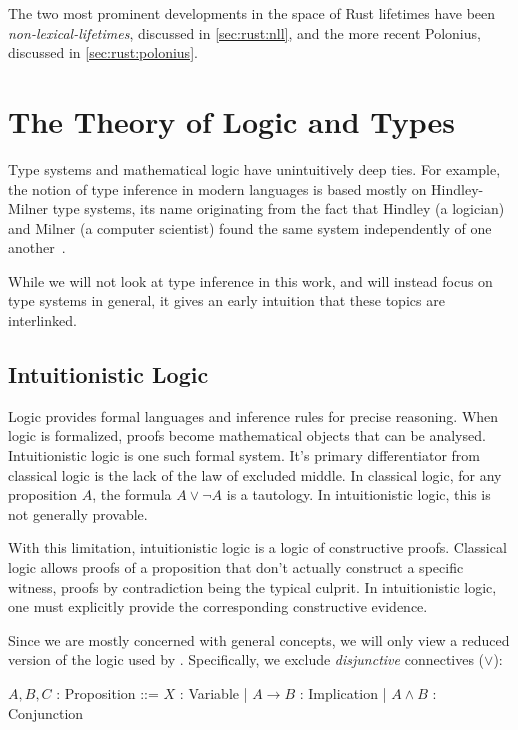 \documentclass[sigplan,11pt,screen,nonacm]{acmart}
\begin{document}
The two most prominent developments in the space of Rust lifetimes have been \emph{non-lexical-lifetimes}, discussed in \cref{sec:rust:nll}, and the more recent Polonius, discussed in \cref{sec:rust:polonius}.

\section{The Theory of Logic and Types} \label{sec:theory}

Type systems and mathematical logic have unintuitively deep ties. For example, the notion of type inference in modern languages is based mostly on Hindley-Milner type systems, its name originating from the fact that Hindley (a logician) and Milner (a computer scientist) found the same system independently of one another~\cite{hindley, milner}.

While we will not look at type inference in this work, and will instead focus on type systems in general, it gives an early intuition that these topics are interlinked.

\subsection{Intuitionistic Logic} \label{sec:intuitionistic:logic}

Logic provides formal languages and inference rules for precise reasoning. When logic is formalized, proofs become mathematical objects that can be analysed. Intuitionistic logic is one such formal system. It's primary differentiator from classical logic is the lack of the law of excluded middle. In classical logic, for any proposition \(A\), the formula \(A \lor \lnot A\) is a tautology. In intuitionistic logic, this is not generally provable.~\cite{mints-intro-intuitionistic-logic}

With this limitation, intuitionistic logic is a logic of constructive proofs. Classical logic allows proofs of a proposition that don't actually construct a specific witness, proofs by contradiction being the typical culprit. In intuitionistic logic, one must explicitly provide the corresponding constructive evidence.

Since we are mostly concerned with general concepts, we will only view a reduced version of the logic used by \citet{wadler-linear-taste}. Specifically, we exclude \emph{disjunctive} connectives (\(\lor\)):
\begin{center}
  \begin{bnf}
    \(A, B, C\) : Proposition ::= \(X\) : Variable | \(A \rightarrow B\) : Implication | \(A \land B\) : Conjunction
  \end{bnf}
\end{center}
\end{document}
